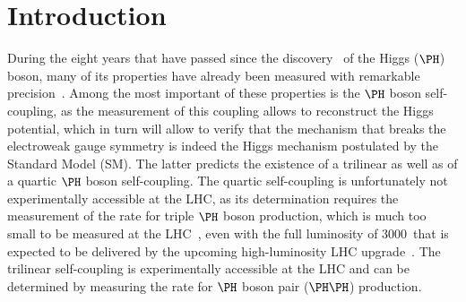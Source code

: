 \section{Introduction}
\label{sec:introduction}

During the eight years that have passed since the discovery~\cite{Higgs-Discovery_CMS,Higgs-Discovery_CMS_long,Higgs-Discovery_ATLAS} of the Higgs ($\PHiggs$) boson,
many of its properties have already been measured with remarkable precision~\cite{HIG-14-042,HIG-15-002,ATLAS_SpinCP,HIG-14-018,HIG-16-041}.
Among the most important of these properties is the $\PHiggs$ boson self-coupling, as the measurement of this coupling allows to reconstruct the Higgs potential,
which in turn will allow to verify that the mechanism that breaks the electroweak gauge symmetry is indeed the Higgs mechanism postulated by the Standard Model (SM).
The latter predicts the existence of a trilinear as well as of a quartic $\PHiggs$ boson self-coupling.
The quartic self-coupling is unfortunately not experimentally accessible at the LHC,
as its determination requires the measurement of the rate for triple $\PHiggs$ boson production, 
which is much too small to be measured at the LHC~\cite{de_Florian_2020}, 
even with the full luminosity of $3000$~\fbinv that is expected to be delivered by the upcoming high-luminosity LHC upgrade~\cite{HL-LHC-TDR}.
The trilinear self-coupling is experimentally accessible at the LHC and can be determined by measuring the rate for $\PHiggs$ boson pair ($\HH$) production.

